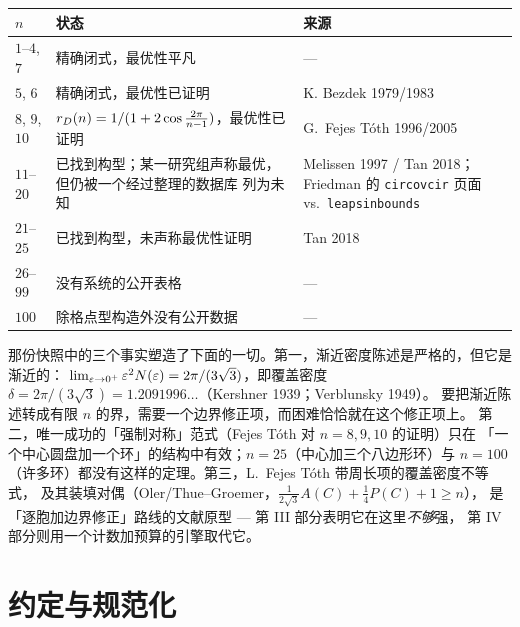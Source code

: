 \begin{center}
\footnotesize
\begin{tabular}{@{}>{\raggedright\arraybackslash}p{}>{\raggedright\arraybackslash}p{}>{\raggedright\arraybackslash}p{}@{}}
\toprule
$n$ & 状态 & 来源 \\
\midrule
$1$--$4$, $7$ & 精确闭式，最优性平凡 & --- \\
$5$, $6$ & 精确闭式，最优性已证明 & K. Bezdek 1979/1983 \\
$8$, $9$, $10$ & $r_{D}(n)=1/(1+2\cos\frac{2\pi}{n-1})$，最优性已证明 &
G.~Fejes T\'oth 1996/2005 \\
$11$--$20$ & 已找到构型；某一研究组声称最优，但仍被一个经过整理的数据库
列为未知 & Melissen 1997 / Tan 2018；Friedman 的
\texttt{circovcir} 页面 vs.\ \texttt{leapsinbounds} \\
$21$--$25$ & 已找到构型，未声称最优性证明 & Tan 2018 \\
$26$--$99$ & 没有系统的公开表格 & --- \\
$100$ & 除格点型构造外没有公开数据 & --- \\
\bottomrule
\end{tabular}
\end{center}

那份快照中的三个事实塑造了下面的一切。第一，渐近密度陈述是严格的，但它是渐近的：
$\lim_{\varepsilon\to0^+}\varepsilon^2N(\varepsilon)=2\pi/(3\sqrt3)$，即覆盖密度
$\delta=2\pi/(3\sqrt3)=1.2091996\ldots$（Kershner 1939；Verblunsky 1949）。
要把渐近陈述转成有限 $n$ 的界，需要一个边界修正项，而困难恰恰就在这个修正项上。
第二，唯一成功的「强制对称」范式（Fejes T\'oth 对 $n=8,9,10$ 的证明）只在
「一个中心圆盘加一个环」的结构中有效；$n=25$（中心加三个八边形环）与
$n=100$（许多环）都没有这样的定理。第三，L.~Fejes T\'oth 带周长项的覆盖密度不等式，
及其装填对偶（Oler/Thue--Groemer，$\frac{1}{2\sqrt3}A(C)+\frac14P(C)+1\ge n$），
是「逐胞加边界修正」路线的文献原型 --- 第 III 部分表明它在这里\emph{不够}强，
第 IV 部分则用一个计数加预算的引擎取代它。

\section{约定与规范化}

